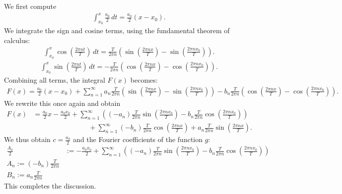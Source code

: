 \documentclass[11pt]{article}
\begin{document}
\begin{solution}
    We first compute 
    \begin{gather*}
        \int_{x_0}^x \frac{a_0}{2} \, dt = \frac{a_0}{2} (x - x_0).
    \end{gather*}
    We integrate the sign and cosine terms, using the fundamental theorem of calculus:
    \begin{gather*}
        \int_{x_0}^x \cos\left(\frac{2\pi n t}{T}\right) \, dt 
        = 
        \frac{T}{2\pi n} \left( \sin\left(\frac{2\pi n x}{T}\right) - \sin\left(\frac{2\pi n x_0}{T}\right) \right).
    \end{gather*}
    \begin{gather*}
        \int_{x_0}^x \sin\left(\frac{2\pi n t}{T}\right) \, dt 
        = 
        -\frac{T}{2\pi n} \left( \cos\left(\frac{2\pi n x}{T}\right) - \cos\left(\frac{2\pi n x_0}{T}\right) \right).
    \end{gather*}
    Combining all terms, the integral \( F(x) \) becomes:
    \begin{gather*}
        F(x) 
        = 
        \frac{a_0}{2} (x - x_0) 
        + 
        \sum_{n=1}^\infty 
        a_n \frac{T}{2\pi n} \left( \sin\left(\frac{2\pi n x}{T}\right) - \sin\left(\frac{2\pi n x_0}{T}\right) \right) 
        - 
        b_n \frac{T}{2\pi n} \left( \cos\left(\frac{2\pi n x}{T}\right) - \cos\left(\frac{2\pi n x_0}{T}\right) \right).
    \end{gather*}
    We rewrite this once again and obtain
    \begin{align*}
        F(x) 
        &
        = 
        \frac{a_0}{2} x 
        - 
        \frac{a_0 x_0 }{2}
        + 
        \sum_{n=1}^\infty 
        \left( 
        (-a_n) \frac{T}{2\pi n} \sin\left(\frac{2\pi n x_0}{T}\right) 
        - 
        b_n \frac{T}{2\pi n} \cos\left(\frac{2\pi n x_0}{T}\right) 
        \right)
        \\&\qquad\qquad\qquad\qquad 
        + 
        \sum_{n=1}^\infty 
        (-b_n) \frac{T}{2\pi n} \cos\left(\frac{2\pi n x}{T}\right)
        + 
        a_n \frac{T}{2\pi n} \sin\left(\frac{2\pi n x}{T}\right) 
        .
    \end{align*}
    We thus obtain $c = \frac{a_0}{2}$ and the Fourier coefficients of the function $g$:
    \begin{align*}
        \frac{A_0}{2} &:= -\frac{a_0 x_0 }{2}
        + 
        \sum_{n=1}^\infty 
        \left( 
        (-a_n) \frac{T}{2\pi n} \sin\left(\frac{2\pi n x_0}{T}\right) 
        - 
        b_n \frac{T}{2\pi n} \cos\left(\frac{2\pi n x_0}{T}\right) 
        \right)
        \\
        A_n := (-b_n) \frac{T}{2\pi n} 
        \\
        B_n := a_n \frac{T}{2\pi n} 
    \end{align*}
    This completes the discussion. 
\end{solution}
\end{document}
